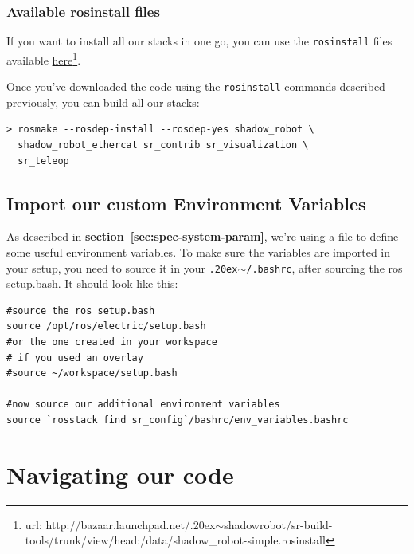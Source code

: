 \documentclass[12pt]{article}
\newcommand{\linuxtilde}{\raise.20ex\hbox{$\scriptstyle\mathtt{\sim}$}}
\newcommand{\link}[1]{\hyperref[sec:#1]{\textbf{section~\ref*{sec:#1}}}}
\begin{document}
\subsubsection{Available rosinstall files}
\par If you want to install all our stacks in one go, you can use the \texttt{rosinstall} files available \href{http://bazaar.launchpad.net/~shadowrobot/sr-build-tools/trunk/view/head:/data/shadow_robot-simple.rosinstall}{here}\footnote{url: http://bazaar.launchpad.net/\linuxtilde shadowrobot/sr-build-tools/trunk/view/head:/data/shadow\_robot-simple.rosinstall}.\\

\par Once you've downloaded the code using the \texttt{rosinstall} commands described previously, you can build all our stacks:
  \begin{lstlisting}[escapeinside='']
> rosmake --rosdep-install --rosdep-yes shadow_robot \
  shadow_robot_ethercat sr_contrib sr_visualization \
  sr_teleop
  \end{lstlisting}

\subsection{Import our custom Environment Variables}
\label{sec:import-vars}
\par As described in \link{spec-system-param}, we're using a file to define some useful environment variables. To make sure the variables are imported in your setup, you need to source it in your \texttt{\linuxtilde/.bashrc}, after sourcing the ros setup.bash. It should look like this:
  \begin{lstlisting}[title={\textbf{\linuxtilde/.bashrc}}, upquote=true]
#source the ros setup.bash
source /opt/ros/electric/setup.bash
#or the one created in your workspace
# if you used an overlay
#source ~/workspace/setup.bash

#now source our additional environment variables
source `rosstack find sr_config`/bashrc/env_variables.bashrc
  \end{lstlisting}

\newpage

\section{Navigating our code}
\label{sec:navigate}
\end{document}
